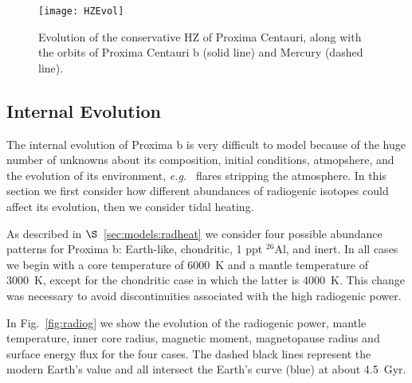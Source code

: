 \documentclass[preprint,12pt]{aastex}
\def\eg{{\it e.g.\ }}
\begin{document}
\begin{figure}[ht]
\centering
\texttt{[image: HZEvol]}
\caption{Evolution of the conservative HZ of Proxima Centauri, along with the orbits of Proxima Centauri b (solid line) and Mercury (dashed line).}
\label{fig:HZEvol}
\end{figure}

\subsection{Internal Evolution}
\label{sec:results:internal}


The internal evolution of Proxima b is very difficult to model because
of the huge number of unknowns about its composition, initial
conditions, atmopshere, and the evolution of its environment, \eg
flares stripping the atmosphere. In this section we first consider how
different abundances of radiogenic isotopes could affect its
evolution, then we consider tidal heating.




As described in $\S$~\ref{sec:models:radheat} we consider four
possible abundance patterns for Proxima b: Earth-like, chondritic, 1
ppt $^{26}$Al, and inert. In all cases we begin with a core
temperature of 6000~K and a mantle temperature of 3000~K, except for
the chondritic case in which the latter is 4000~K. This change
was necessary to avoid discontinuities associated with the high
radiogenic power.

In Fig.~\ref{fig:radiog} we show the evolution of the radiogenic
power, mantle temperature, inner core radius, magnetic moment,
magnetopause radius and surface energy flux for the four cases. The
dashed black lines represent the modern Earth's value and all
intersect the Earth's curve (blue) at about 4.5~Gyr.
\end{document}
